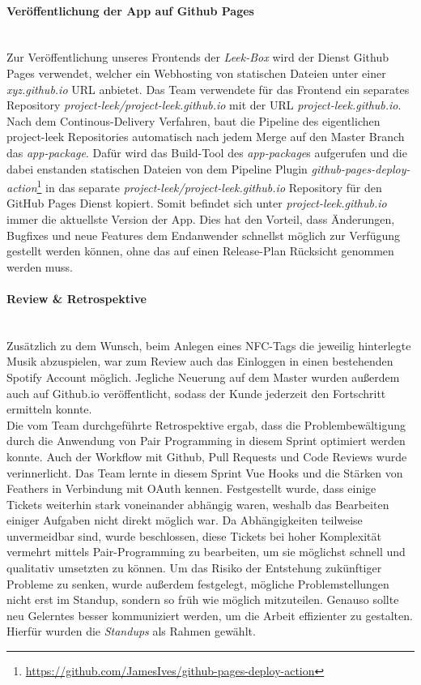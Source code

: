 \documentclass[10pt, a4paper]{article}
\begin{document}
\begin{onehalfspace}
\paragraph*{Veröffentlichung der App auf Github Pages} $~$ \\
Zur Veröffentlichung unseres Frontends der \textit{Leek-Box} wird der Dienst Github Pages verwendet, welcher ein Webhosting von statischen Dateien unter einer \textit{xyz.github.io} URL anbietet.
Das Team verwendete für das Frontend ein separates Repository \textit{project-leek/project-leek.github.io} mit der URL \textit{project-leek.github.io}.
Nach dem Continous-Delivery Verfahren, baut die Pipeline des eigentlichen project-leek Repositories automatisch nach jedem Merge auf den Master Branch das \textit{app-package}.
Dafür wird das Build-Tool des \textit{app-package}s aufgerufen und die dabei enstanden statischen Dateien von dem Pipeline Plugin
\textit{github-pages-deploy-action}\footnote{\raggedright\url{https://github.com/JamesIves/github-pages-deploy-action}} in das separate
\textit{project-leek/project-leek.github.io} Repository für den GitHub Pages Dienst kopiert. Somit befindet sich unter \textit{project-leek.github.io} immer die aktuellste Version der App.
Dies hat den Vorteil, dass Änderungen, Bugfixes und neue Features dem Endanwender schnellst möglich zur Verfügung gestellt werden können, ohne das auf einen Release-Plan Rücksicht genommen werden muss.

\paragraph*{Review \& Retrospektive} $~$ \\
Zusätzlich zu dem Wunsch, beim Anlegen eines NFC-Tags die jeweilig hinterlegte Musik abzuspielen, war zum Review auch das Einloggen
in einen bestehenden Spotify Account möglich. Jegliche Neuerung auf dem Master wurden außerdem auch auf Github.io veröffentlicht, sodass der Kunde jederzeit den Fortschritt ermitteln konnte.
\\
Die vom Team durchgeführte Retrospektive ergab, dass die Problembewältigung durch die Anwendung von Pair Programming in diesem Sprint optimiert werden konnte.
Auch der Workflow mit Github, Pull Requests und Code Reviews wurde verinnerlicht.
Das Team lernte in diesem Sprint Vue Hooks und die Stärken von Feathers in Verbindung mit OAuth kennen. Festgestellt wurde, dass einige Tickets weiterhin stark voneinander abhängig waren,
weshalb das Bearbeiten einiger Aufgaben nicht direkt möglich war. Da Abhängigkeiten teilweise unvermeidbar sind, wurde beschlossen, diese Tickets bei hoher
Komplexität vermehrt mittels Pair-Programming zu bearbeiten, um sie möglichst schnell und qualitativ umsetzten zu können. Um das Risiko der Entstehung zukünftiger Probleme
zu senken, wurde außerdem festgelegt, mögliche Problemstellungen nicht erst im Standup, sondern so früh wie möglich mitzuteilen. Genauso sollte neu Gelerntes besser
kommuniziert werden, um die Arbeit effizienter zu gestalten. Hierfür wurden die \textit{Standups} als Rahmen gewählt.


\end{onehalfspace}
\end{document}
